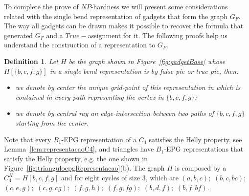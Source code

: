 \documentclass[preprint,12pt]{elsarticle} %
\newtheorem{defi}[theorem]{Definition}
\begin{document}

To complete the prove of $NP$-hardness we will  present some considerations related with the single bend representation of gadgets that form the graph $G_F$. The way all gadgets can be drawn makes it possible to recover the formula that generated $G_F$ and a $True-$assignment for it. The following proofs help us understand the construction of a representation to $G_F$.  


\begin{defi}
Let $H$ be the graph shown in Figure~\ref{fig:gadgetBase} whose $H[\{b, c, f, g \}]$ in a single bend representation is by false pie or true pie, then:

\begin{itemize}
\item we denote by \emph{center} the unique grid-point of this representation in which is contained in every path representing the vertex in $ \{b, c, f, g \}$; \label{lab:lab1}

\item we denote by \emph {central ray} an edge-intersection  between two paths of $ \{b, c, f, g \} $ starting from the center.
\end{itemize}





\end{defi}


Note that every $B_1$-EPG representation of a $C_4$ satisfies the Helly property, see Lemma~\ref{lem:representacaoC4}, and triangles have $B_1$-EPG representations that satisfy the Helly property, e.g. the one shown in Figure~\ref{fig:trianguloepgRepresentacao}(b). The graph $H$ is composed by a $C_4^{H}=H[b, c, f, g]$ and for eight cycles of size 3, which are $(a,b,c);$ $(b,c,bc);$ $(c,e,g);$ $(c,g,cg);$ $(f,g,h);$ $(f,g,fg);$ $(b,d,f);$ $(b,f,bf).$
\end{document}
